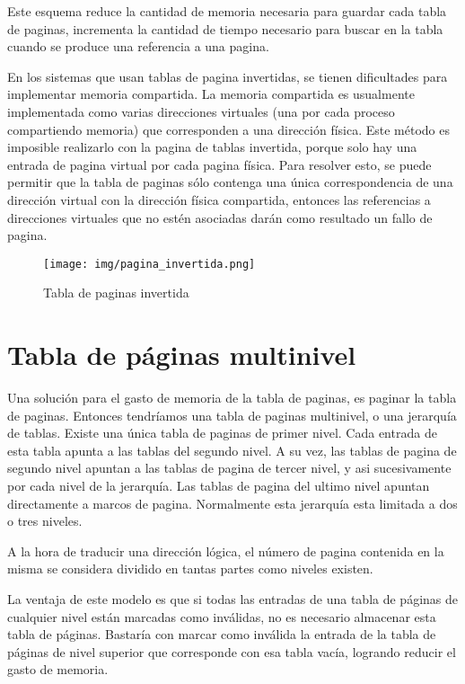 \documentclass{article}
\begin{document}
Este esquema reduce la cantidad de memoria necesaria para guardar cada tabla de paginas, incrementa la cantidad de tiempo necesario para buscar en la tabla cuando se produce una referencia a una pagina.

En los sistemas que usan tablas de pagina invertidas, se tienen dificultades para implementar memoria compartida. La memoria compartida es usualmente implementada como varias direcciones virtuales (una por cada proceso compartiendo memoria) que corresponden a una dirección física. Este método es imposible realizarlo con la pagina de tablas invertida, porque solo hay una entrada de pagina virtual por cada pagina física. Para resolver esto, se puede permitir que la tabla de paginas sólo contenga una única correspondencia de una dirección virtual con la dirección física compartida, entonces las referencias a direcciones virtuales que no estén asociadas darán como resultado un fallo de pagina.

\begin{figure}[H]
	\centering
	\texttt{[image: img/pagina\_invertida.png]}
	\caption{Tabla de paginas invertida}
\end{figure}


{\centering \section*{Tabla de páginas multinivel}}
Una solución para el gasto de memoria de la tabla de paginas, es paginar la tabla de paginas. Entonces tendríamos una tabla de paginas multinivel, o una jerarquía de tablas. Existe una única tabla de paginas de primer nivel. Cada entrada de esta tabla apunta a las tablas del segundo nivel. A su vez, las tablas de pagina de segundo nivel apuntan a las tablas de pagina de tercer nivel, y asi sucesivamente por cada nivel de la jerarquía. Las tablas de pagina del ultimo nivel apuntan directamente a marcos de pagina. Normalmente esta jerarquía esta limitada a dos o tres niveles. 

A la hora de traducir una dirección lógica, el número de pagina contenida en la misma se considera dividido en tantas partes como niveles existen.

La ventaja de este modelo es que si todas las entradas de una tabla de páginas de cualquier nivel están marcadas como inválidas, no es necesario almacenar esta tabla de páginas. Bastaría con marcar como inválida la entrada de la tabla de páginas de nivel superior que corresponde con esa tabla vacía, logrando reducir el gasto de memoria.
\end{document}
